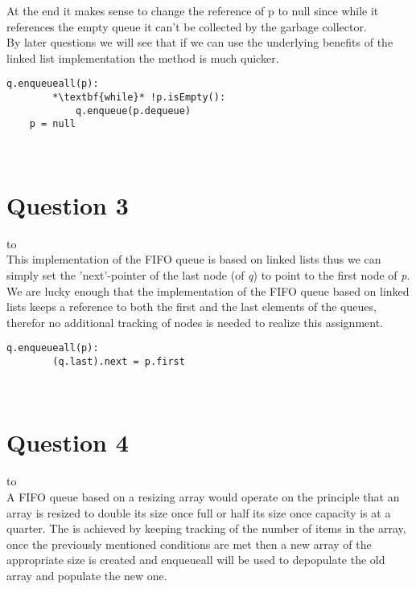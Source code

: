 \documentclass[a4paper]{article}
\def\headline#1{\hbox to \hsize{\hrulefill\quad\lower.3em\hbox{#1}\quad\hrulefill}}
\begin{document}
\noindent
At the end it makes sense to change the reference of p to null since while it references the empty queue it can't be collected by the garbage collector. 
\ \\

\noindent
By later questions we will see that if we can use the underlying benefits of the linked list implementation the method is much quicker.
 \\

\noindent

\begin{lstlisting}[escapeinside={{*}{*}}]
    q.enqueueall(p):
        *\textbf{while}* !p.isEmpty():
            q.enqueue(p.dequeue)
    p = null
\end{lstlisting}

\ \\
\section*{Question 3}
\headline{-} \ \\
This implementation of the FIFO queue is based on linked lists thus we can simply set the 
'next'-pointer of the last node (of \textit{q}) to point to the first node of \textit{p}.
\\

\noindent
We are lucky enough that the implementation of the FIFO queue based on linked lists keeps a reference to both the first and the last elements of the queues, therefor no additional tracking of nodes is needed to realize this assignment.
 \\

\noindent

\begin{lstlisting}[escapeinside={{*}{*}}]
    q.enqueueall(p):
        (q.last).next = p.first
\end{lstlisting}
 
\ \\

\newpage
\section*{Question 4}
\headline{-} \ \\
A FIFO queue based on a resizing array would operate on the principle that an array is resized 
to double its size once full or half its size once capacity is at a quarter. The is achieved by keeping tracking of 
the number of items in the array, once the previously mentioned conditions are met then a new array 
of the appropriate size is created and enqueueall will be used to depopulate the old array and populate the new one.
\\
\end{document}

